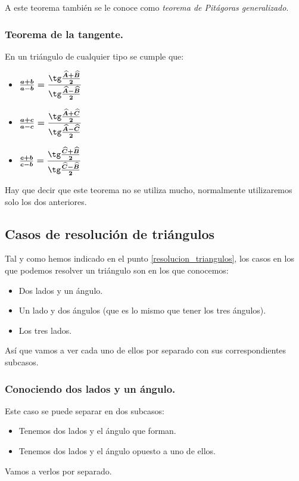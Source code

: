 \documentclass[a4paper,11pt,answers]{exam}
\begin{document}
A este teorema también se le conoce como \emph{teorema de Pitágoras generalizado}.

\subsubsection{Teorema de la tangente.}
En un triángulo de cualquier tipo se cumple que:
\begin{itemize}
\item $\boldsymbol{\frac{a+b}{a-b} = \cfrac{\tg \frac{\widehat{A}+\widehat{B}}{2}}
    {\tg \frac{\widehat{A}-\widehat{B}}{2}}}$
\item $\boldsymbol{\frac{a+c}{a-c} = \cfrac{\tg \frac{\widehat{A}+\widehat{C}}{2}}
    {\tg \frac{\widehat{A}-\widehat{C}}{2}}}$
\item $\boldsymbol{\frac{c+b}{c-b} = \cfrac{\tg \frac{\widehat{C}+\widehat{B}}{2}}
    {\tg \frac{\widehat{C}-\widehat{B}}{2}}}$
\end{itemize}
Hay que decir que este teorema no se utiliza mucho, normalmente utilizaremos solo los dos
anteriores.

\subsection{Casos de resolución de triángulos}
Tal y como hemos indicado en el punto \ref{resolucion_triangulos}, los casos en los que podemos
resolver un triángulo son en los que conocemos:
\begin{itemize}
\item Dos lados y un ángulo.
\item Un lado y dos ángulos (que es lo mismo que tener los tres ángulos).
\item Los tres lados.
\end{itemize}
Así que vamos a ver cada uno de ellos por separado con sus correspondientes subcasos.
\subsubsection{Conociendo dos lados y un ángulo.}
Este caso se puede separar en dos subcasos:
\begin{itemize}
\item Tenemos dos lados y el ángulo que forman.
\item Tenemos dos lados y el ángulo opuesto a uno de ellos.
\end{itemize}
Vamos a verlos por separado.
\end{document}
